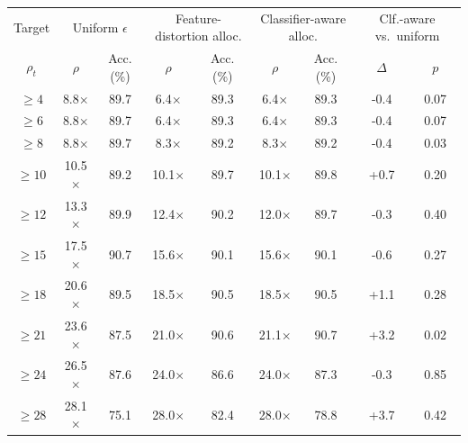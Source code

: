 \begin{tabular}{ccccccccc}
\toprule
Target & \multicolumn{2}{c}{Uniform $\epsilon$} & \multicolumn{2}{c}{Feature-distortion alloc.} & \multicolumn{2}{c}{Classifier-aware alloc.} & \multicolumn{2}{c}{Clf.-aware vs.\ uniform} \\
$\rho_t$ & $\rho$ & Acc. (\%) & $\rho$ & Acc. (\%) & $\rho$ & Acc. (\%) & $\Delta$ & $p$ \\
\midrule
$\ge4$ & 8.8$\times$ & 89.7 & 6.4$\times$ & 89.3 & 6.4$\times$ & 89.3 & -0.4 & 0.07 \\
$\ge6$ & 8.8$\times$ & 89.7 & 6.4$\times$ & 89.3 & 6.4$\times$ & 89.3 & -0.4 & 0.07 \\
$\ge8$ & 8.8$\times$ & 89.7 & 8.3$\times$ & 89.2 & 8.3$\times$ & 89.2 & -0.4 & 0.03 \\
$\ge10$ & 10.5$\times$ & 89.2 & 10.1$\times$ & 89.7 & 10.1$\times$ & 89.8 & +0.7 & 0.20 \\
$\ge12$ & 13.3$\times$ & 89.9 & 12.4$\times$ & 90.2 & 12.0$\times$ & 89.7 & -0.3 & 0.40 \\
$\ge15$ & 17.5$\times$ & 90.7 & 15.6$\times$ & 90.1 & 15.6$\times$ & 90.1 & -0.6 & 0.27 \\
$\ge18$ & 20.6$\times$ & 89.5 & 18.5$\times$ & 90.5 & 18.5$\times$ & 90.5 & +1.1 & 0.28 \\
$\ge21$ & 23.6$\times$ & 87.5 & 21.0$\times$ & 90.6 & 21.1$\times$ & 90.7 & +3.2 & 0.02 \\
$\ge24$ & 26.5$\times$ & 87.6 & 24.0$\times$ & 86.6 & 24.0$\times$ & 87.3 & -0.3 & 0.85 \\
$\ge28$ & 28.1$\times$ & 75.1 & 28.0$\times$ & 82.4 & 28.0$\times$ & 78.8 & +3.7 & 0.42 \\
\bottomrule
\end{tabular}
